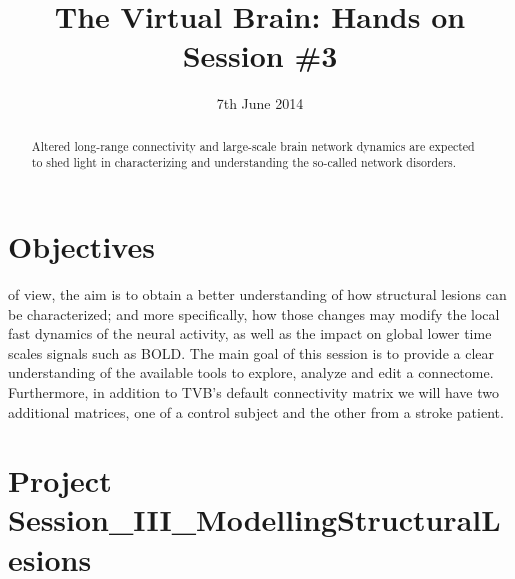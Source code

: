\documentclass{tufte-handout}
\title{The Virtual Brain: Hands on Session \#3}
\date{7th June 2014}
\begin{document}

\newpage
\ClearWallPaper
\begin{abstract}
\noindent  Altered long-range connectivity and large-scale brain network dynamics are expected to shed light in characterizing and understanding the so-called network disorders. 
\begin{marginfigure}%
  \label{fig:marginfig}
\end{marginfigure}
\end{abstract}


\section{Objectives}\label{sec:objectives}

 of view, the aim is to obtain a better understanding of
how structural lesions can be characterized; and more specifically, how those
changes may modify the local fast dynamics of the neural activity, as well
as the impact on global lower time scales signals such as BOLD. The main goal of this
session is to provide a clear understanding of the available tools to explore, analyze and edit
a connectome. Furthermore, in addition to TVB's default connectivity matrix we will have two additional matrices, one of a control subject and the other from a stroke
patient.

\section{Project Session\_III\_ModellingStructuralLesions}\label{sec:project_data}
\end{document}
